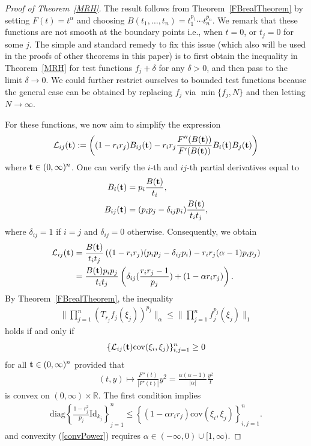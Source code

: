 \documentclass[9pt, a4paper]{amsart}
\newcommand{\R}{\mathbb{R}}
\newcommand{\1}{{\chi_{}}}%
\numberwithin{equation}{section}
\begin{document}
\begin{proof}[Proof of Theorem~\ref{MRH}]

The result follows from Theorem~\ref{FBrealTheorem} by setting $F(t)=t^{\alpha}$ and choosing $B(t_1,
\ldots,t_n)=t_1^{p_1}\cdots t_n^{p_n}$. We remark that these functions are not smooth at the boundary points i.e., when $t=0$, or $t_{j}=0$ for some $j$. The simple and standard remedy to fix this issue (which also will be used in the proofs of other theorems in this paper)  is to  first obtain the inequality in Theorem~\ref{MRH} for test functions $f_{j}+\delta$ for any $\delta>0$, and then pass to the limit $\delta \to 0$. We could further restrict ourselves to bounded test functions because the general case can be obtained by replacing $f_{j}$ via $\min \{f_{j}, N\}$ and then letting $N \to \infty$. 


For these functions, we now aim to simplify the expression
\begin{align}
\mathcal{L}_{ij}({\bf{t}}):=\left((1-r_ir_j)B_{ij}({\bf{t}})-r_ir_j\frac{F''(B({\bf{t}}))}{F'(B(\bf{t}))}B_{i}({\bf{t}})B_{j}({\bf{t}}) \right)
\end{align}
where ${\bf{t}}\in (0, \infty)^{n}$. One can verify the $i$-th and $ij$-th partial derivatives equal to 
\begin{align*}
B_i({\bf{t}})&=p_i\frac{B({\bf{t}})}{t_i},\\
B_{ij}({\bf{t}})&=(p_ip_j-\delta_{ij}p_i)\frac{B({\bf{t}})}{t_it_j},
\end{align*}
where $\delta_{ij}=1$ if $i=j$ and $\delta_{ij}=0$ otherwise. 
Consequently, we obtain
\begin{align*}
\mathcal{L}_{ij}({\bf{t}})&=\frac{B({\bf{t}})}{t_it_j}\left((1-r_ir_j)(p_ip_j-\delta_{ij}p_i)-r_ir_j(\alpha-1)p_ip_j\right)\\
&=\frac{B({\bf{t}})p_ip_j}{t_it_j}\left(\delta_{ij}(\frac{r_ir_j-1}{p_j})+(1-\alpha r_ir_j)\right).
\end{align*}
By Theorem~\ref{FBrealTheorem},  the inequality 
 \begin{align}\label{multipultir11}
 \| \prod_{j=1}^{n} (T_{r_{j}}f_{j}(\xi_{j}))^{p_{j}}\|_{\alpha} \leq \|  \prod_{j=1}^{n} f^{p_{j}}_{j}(\xi_{j})\|_{1}
 \end{align}
 holds if and only if 
 \begin{equation}\label{Ltleq0}
   \{\mathcal{L}_{ij}({\bf{t}})\mathrm{cov}(\xi_{i}, \xi_{j})\}_{i,j=1}^n\geq 0 
 \end{equation}
 for all ${\bf{t}}\in (0, \infty)^{n}$ provided that 
\begin{align}\label{convPower}
(t,y) \mapsto \frac{F''(t)}{|F'(t)|}y^{2}=\frac{\alpha(\alpha-1)}{|\alpha|}\frac{y^2}{t}
\end{align}
is convex on $(0,\infty)\times \R$. The first condition implies
 \begin{align}\label{localreal1}
       \mathrm{diag}\left\{ \frac{1-r_{j}^{2}}{p_{j}  } \mathrm{Id}_{k_{j}}\right\}_{j=1}^{n} \leq  \left\{(1-\alpha r_{i}r_{j})\mathrm{cov}(\xi_{i}, \xi_{j})\right\}_{i,j=1}^{n}.
 \end{align}
and convexity (\ref{convPower}) requires $\alpha \in (-\infty,0)\cup [1, \infty)$.


\end{proof}
\end{document}
